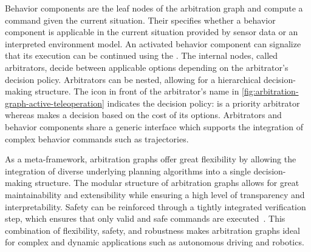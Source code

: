Behavior components are the leaf nodes of the arbitration graph and compute a command given the current situation.
Their  specifies whether a behavior component is applicable in the current situation provided by sensor data or an interpreted environment model.
An activated behavior component can signalize that its execution can be continued using the .
The internal nodes, called arbitrators, decide between applicable options depending on the arbitrator's decision policy.
Arbitrators can be nested, allowing for a hierarchical decision-making structure.
The icon in front of the arbitrator's name in \cref{fig:arbitration-graph-active-teleoperation} indicates the decision policy:  is a priority arbitrator whereas  makes a decision based on the cost of its options.
Arbitrators and behavior components share a generic interface which supports the integration of complex behavior commands such as trajectories.

As a meta-framework, arbitration graphs offer great flexibility by allowing the integration of diverse underlying planning algorithms into a single decision-making structure.
The modular structure of arbitration graphs allows for great maintainability and extensibility while ensuring a high level of transparency and interpretability.
Safety can be reinforced through a tightly integrated verification step, which ensures that only valid and safe commands are executed~\cite{orzechowskiVerhaltensentscheidungFuerAutomatisierte2023, spiekerBetterSafeSorry2024}.
This combination of flexibility, safety, and robustness makes arbitration graphs ideal for complex and dynamic applications such as autonomous driving and robotics.

